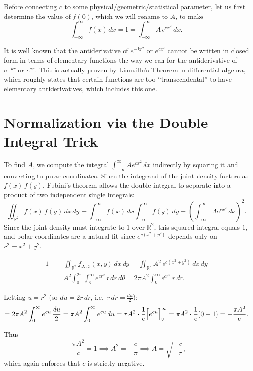 \documentclass[12pt]{article}
\begin{document}
Before connecting $c$ to some physical/geometric/statistical parameter, let us first determine the value of $f(0)$, which we will rename to $A$, to make
\[
    \int_{-\infty}^{\infty} f(x)\,dx = 1 = \int_{-\infty}^{\infty} A\,e^{cx^2}\,dx.
\]
 
It is well known that the antiderivative of $e^{-kr^2}$ or $e^{cx^2}$ cannot be written in closed form in terms of elementary functions the way we can for the antiderivative of $e^{-kr}$ or $e^{cx}$. This is actually proven by Liouville's Theorem in differential algebra, which roughly states that certain functions are too ``transcendental'' to have elementary antiderivatives, which includes this one.
 
\section*{Normalization via the Double Integral Trick}
 
To find $A$, we compute the integral $\int_{-\infty}^{\infty} Ae^{cx^2}\,dx$ indirectly by 
squaring it and converting to polar coordinates. Since the integrand of the joint density 
factors as $f(x)\,f(y)$, Fubini's theorem allows the double integral to separate into a 
product of two independent single integrals:
\[
    \iint_{\mathbb{R}^2} f(x)\,f(y)\,dx\,dy 
    = \int_{-\infty}^{\infty} f(x)\,dx \int_{-\infty}^{\infty} f(y)\,dy 
    = \left(\int_{-\infty}^{\infty} Ae^{cx^2}\,dx\right)^2.
\]
Since the joint density must integrate to $1$ over $\mathbb{R}^2$, this squared integral 
equals $1$, and polar coordinates are a natural fit since $e^{c(x^2+y^2)}$ depends only 
on $r^2 = x^2 + y^2$.
 
\begin{align*}
1 &= \iint_{\mathbb{R}^2} f_{X,Y}(x,y)\,dx\,dy
   = \iint_{\mathbb{R}^2} A^2\, e^{c(x^2+y^2)}\,dx\,dy \\
  &= A^2 \int_0^{2\pi}\int_0^{\infty} e^{cr^2}\,r\,dr\,d\theta
   = 2\pi A^2 \int_0^{\infty} e^{cr^2}\,r\,dr.
\end{align*}
 
Letting $u = r^2$ (so $du = 2r\,dr$, i.e.\ $r\,dr = \tfrac{du}{2}$):
\[
    = 2\pi A^2 \int_0^{\infty} e^{cu}\,\frac{du}{2}
    = \pi A^2 \int_0^{\infty} e^{cu}\,du
    = \pi A^2 \cdot \frac{1}{c}\Bigl[e^{cu}\Bigr]_0^{\infty}
    = \pi A^2 \cdot \frac{1}{c}(0 - 1)
    = -\frac{\pi A^2}{c}.
\]
 
Thus
\[
    -\frac{\pi A^2}{c} = 1
    \implies A^2 = -\frac{c}{\pi}
    \implies \boxed{A = \sqrt{-\frac{c}{\pi}}},
\]
which again enforces that $c$ is strictly negative.
 
\end{document}
